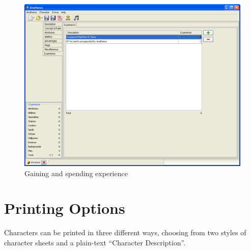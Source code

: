 \begin{figure}
	\centering
		\includegraphics[width=1.00\textwidth]{images/Experience.png}
	\caption{Gaining and spending experience}
	\label{fig:Experience}
\end{figure}

\section{Printing Options}
Characters can be printed in three different ways, choosing from two styles of character sheets and a plain-text "`Character Description"'.